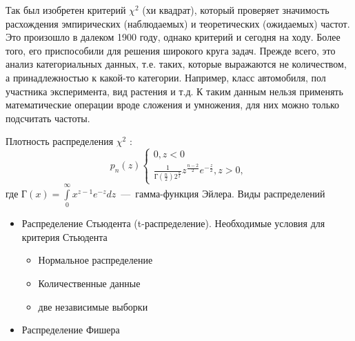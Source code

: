 \documentclass[14pt,a4paper]{article}
\begin{document}
Так был изобретен критерий $\chi^2$ (хи квадрат), который проверяет значимость расхождения эмпирических (наблюдаемых) и теоретических (ожидаемых) частот. Это произошло в далеком 1900 году, однако критерий и сегодня на ходу. Более того, его приспособили для решения широкого круга задач. Прежде всего, это анализ категориальных данных, т.е. таких, которые выражаются не количеством, а принадлежностью к какой-то категории. Например, класс автомобиля, пол участника эксперимента, вид растения и т.д. К таким данным нельзя применять математические операции вроде сложения и умножения, для них можно только подсчитать частоты.

Плотность распределения $\chi^2$ \cite{Plis2003}:
\begin{equation}
    p_n(z)\begin{cases}
        0,  z<0\\
        \frac{1}{\text{Г}(\frac{n}{2})2^{\frac{n}{2}}}z^\frac{n-2}{2}e^{-\frac{z}{2}}, z>0,
    \end{cases}
\end{equation}
где $\text{Г}(x) = \int\limits_{0}^{\infty} x^{z-1}e^{-z}dz$~---~гамма-функция Эйлера.
Виды распределений
\begin{itemize}
    \item Распределение Стьюдента (t-распределение).
    Необходимые условия для критерия Стьюдента
    \begin{itemize}
        \item Нормальное распределение
        \item Количественные данные
        \item две независимые выборки
    \end{itemize}
    \item  Распределение Фишера
\end{itemize}
\end{document}
